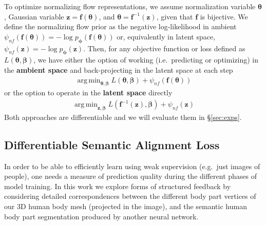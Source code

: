 \documentclass[runningheads]{llncs}
\newcommand{\thetab}{\bm{\theta}}
\newcommand{\betab}{\bm{\beta}}
\newcommand{\bphi}{\bm{\phi}}
\newcommand{\zz}{\mathbf{z}}
\newcommand{\ff}{\mathbf{f}}
\newcommand{\eg}{e.g.\ }
\newcommand{\ie}{i.e.\ }
\DeclareMathOperator*{\argmin}{arg\,min}
\begin{document}
 To optimize normalizing flow representations, we assume normalization variable $\thetab$, Gaussian variable $\zz = \ff(\thetab)$, and $\thetab = \ff^{-1}(\zz)$, given that $\ff$ is bijective. We define the normalizing flow prior as the negative log-likelihood in ambient $\psi_{nf}(\ff(\thetab)) = -\log p_{\bphi}(\ff(\thetab))$ or, equivalently in latent space, $\psi_{nf}(\zz) = -\log p_{\bphi}(\zz)$. Then, for any objective function or loss defined as $L(\thetab, \betab)$, we have either the option of working (\ie predicting or optimizing) in the \textbf{ambient space} and back-projecting in the latent space at each step
\begin{align}
    \argmin_{\thetab, \betab} L(\thetab, \betab) + \psi_{nf}(\ff(\thetab)) \label{eq:nflow_orig}
\end{align}
or the option to operate in the \textbf{latent space} directly
\begin{align}
    \argmin_{\zz, \betab} L(\ff^{-1}(\zz), \betab) +  \psi_{nf}(\zz) \label{eq:nflow_wrp}
\end{align}
Both approaches are differentiable and we will evaluate them in \S\ref{sec:exps}.


\subsection{Differentiable Semantic Alignment Loss}

In order to be able to efficiently learn using weak supervision (\eg just images of people), one needs a measure of prediction quality during the different phases of model training. 
In this work we explore forms of structured feedback by considering detailed correspondences between the different body part vertices of our 3D human body mesh (projected in the image), and the semantic human body part segmentation produced by another neural network. 
\end{document}
